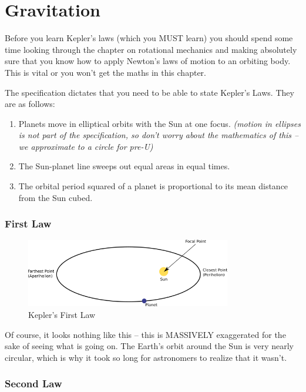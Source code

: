 \documentclass[revision-guide.tex]{subfiles}
\begin{document}
\chapter{Gravitation}
Before you learn Kepler's laws (which you MUST learn) you should spend
some time looking through the chapter on rotational mechanics and making
absolutely sure that you know how to apply Newton's laws of motion to an
orbiting body. This is vital or you won't get the maths in this chapter.

The specification dictates that you need to be able to state Kepler's
Laws. They are as follows:
\begin{enumerate}
\item
  Planets move in elliptical orbits with the Sun at one focus.
  \emph{(motion in ellipses is not part of the specification, so don't
  worry about the mathematics of this -- we approximate to a circle for
  pre-U)}
\item
  The Sun-planet line sweeps out equal areas in equal times.
\item
  The orbital period squared of a planet is proportional to its mean
  distance from the Sun cubed.
\end{enumerate}
\newpage
\subsection{First Law}
\begin{figure}[h]
  \begin{center}
  \includegraphics[width=0.8\textwidth]{figs/chapt-13/kepler-1.png}
\end{center}
  \caption{Kepler's First Law}
  \label{kepler-1}
\end{figure}

Of course, it looks nothing like this -- this is MASSIVELY exaggerated
for the sake of seeing what is going on. The Earth's orbit around the
Sun is very nearly circular, which is why it took so long for
astronomers to realize that it wasn't.

\subsection{Second Law}
\end{document}
